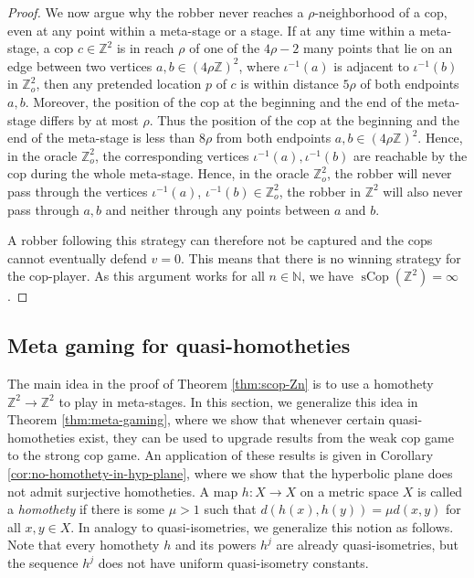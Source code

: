 \documentclass{amsart}
\theoremstyle{definition}
\theoremstyle{remark}
\theoremstyle{remark}
\theoremstyle{definition}
\newcommand{\sCop}{\operatorname{sCop}}
\newcommand{\rhoZ}{(4\rho\mathbb{Z})^2}
\newcommand{\Zo}{\mathbb{Z}_o^2}
\newcommand{\Z}{\mathbb{Z}} %
\begin{document}
\begin{proof}
 We now argue why the robber never reaches a $\rho$-neighborhood of a cop, even at any point within a meta-stage or a stage. If at any time within a meta-stage, a cop $c \in \Z^2$ is in reach $\rho$ of one of the $4\rho-2$ many points that lie on an edge between two vertices $a,b \in \rhoZ$, where $\iota^{-1}(a)$ is adjacent to $\iota^{-1}(b)$ in $\Zo$, then any pretended location $p$ of $c$ is within distance $5\rho$ of both endpoints $a,b$. Moreover, the position of the cop at the beginning and the end of the meta-stage differs by at most $\rho$. Thus the position of the cop at the beginning and the end of the meta-stage is less than $8\rho$ from both endpoints $a,b \in \rhoZ$. Hence, in the oracle $\Zo$, the corresponding vertices $\iota^{-1}(a),\iota^{-1}(b)$ are reachable by the cop during the whole meta-stage. Hence, in the oracle $\Zo$, the robber will never pass through the vertices $\iota^{-1}(a)$, $\iota^{-1}(b) \in \Zo$, the robber in $\Z^2$ will also never pass through $a,b$ and neither through any points between $a$ and $b$.

 A robber following this strategy can therefore not be captured and the cops cannot eventually defend $v=0$. This means that there is no winning strategy for the cop-player. As this argument works for all $n\in \mathbb{N}$, we have $\sCop{(\mathbb{Z}^2)}= \infty$.
\end{proof}






\subsection{Meta gaming for quasi-homotheties }

The main idea in the proof of Theorem \ref{thm:scop-Zn} is to use a homothety $\mathbb{Z}^2 \to \mathbb{Z}^2$ to play in meta-stages. In this section, we generalize this idea in Theorem \ref{thm:meta-gaming}, where we show that whenever certain quasi-homotheties exist, they can be used to upgrade results from the weak cop game to the strong cop game. An application of these results is given in Corollary \ref{cor:no-homothety-in-hyp-plane}, where we show that the hyperbolic plane does not admit surjective homotheties. A map $h \colon X \to X$ on a metric space $X$ is called a \emph{homothety} if there is some $\mu > 1$ such that $d(h(x),h(y)) = \mu d(x,y)$ for all $x,y \in X$. In analogy to quasi-isometries, we generalize this notion as follows. Note that every homothety $h$ and its powers $h^j$ are already quasi-isometries, but the sequence $h^j$ does not have uniform quasi-isometry constants.
\end{document}
